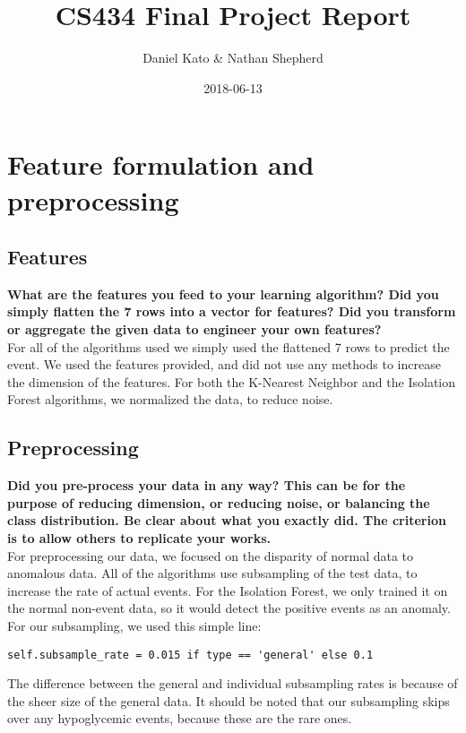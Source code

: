 \documentclass[11pt,a4paper]{article}
\title{CS434 Final Project Report}
\author{Daniel Kato \& Nathan Shepherd}
\date{2018-06-13}
\begin{document}
\maketitle

\section{Feature formulation and preprocessing}
\subsection{Features}
\textbf{What are the features you feed to your learning algorithm? Did you simply flatten the 7 rows into a vector for features? Did you transform or aggregate the given data to engineer your own features?}\\

For all of the algorithms used we simply used the flattened 7 rows to predict the event.
We used the features provided, and did not use any methods to increase the dimension of the features.
For both the K-Nearest Neighbor and the Isolation Forest algorithms, we normalized the data, to reduce noise.

\subsection{Preprocessing}
\textbf{Did you pre-process your data in any way? This can be for the purpose of reducing dimension, or reducing noise, or balancing the class distribution. Be clear about what you exactly did. The criterion is to allow others to replicate your works.}\\

For preprocessing our data, we focused on the disparity of normal data to anomalous data.
All of the algorithms use subsampling of the test data, to increase the rate of actual events.
For the Isolation Forest, we only trained it on the normal non-event data, so it would detect the positive events as an anomaly.
For our subsampling, we used this simple line:
\begin{lstlisting}
self.subsample_rate = 0.015 if type == 'general' else 0.1
\end{lstlisting}
The difference between the general and individual subsampling rates is because of the sheer size of the general data.
It should be noted that our subsampling skips over any hypoglycemic events, because these are the rare ones.
\end{document}
